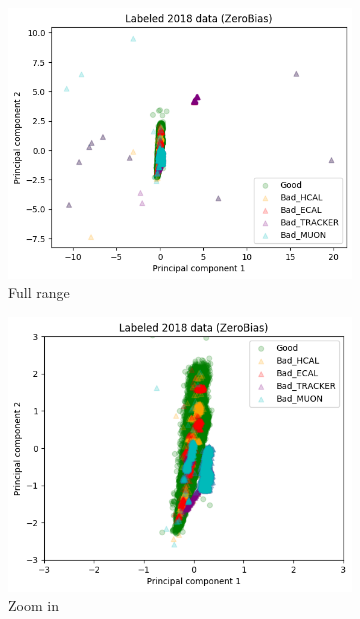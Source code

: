 \begin{figure}[h!]
\begin{subfigure}[b]{0.49\linewidth}
        \includegraphics[width=\linewidth]{images/reco/2018/ZeroBias_subsystem_label.png}
        \caption{Full range}
    \end{subfigure}
    \begin{subfigure}[b]{0.49\linewidth}
        \includegraphics[width=\linewidth]{images/reco/2018/ZeroBias_subsystem_label_short_range.png}
        \caption{Zoom in}
    \end{subfigure}
    \begin{subfigure}[b]{0.49\linewidth}

\end{subfigure}
\end{figure}
